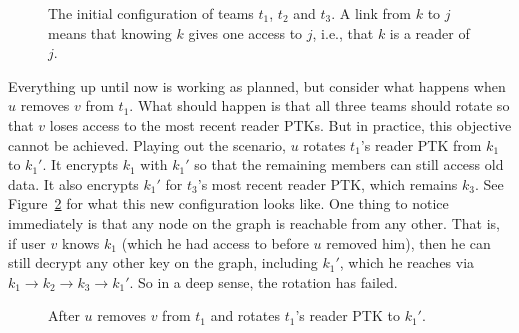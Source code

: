 \begin{figure}[ht]
    \centering
    \caption{The initial configuration of teams $t_1$, $t_2$ and $t_3$.
A link from $k$ to $j$ means that knowing $k$ gives one access to $j$, i.e., that $k$ is a reader of $j$.}
    \label{fig:cycle1}
\end{figure}


Everything up until now is working as planned, but consider what happens when
$u$ removes $v$ from $t_1$. What should happen is that all three teams should 
rotate so that $v$ loses access to the most recent reader PTKs. But in practice, this
objective cannot be achieved. Playing out the scenario, $u$ rotates $t_1$'s reader PTK
from $k_1$ to $k_1'$. It encrypts $k_1$ with $k_1'$ so that the remaining 
members can still access old data. It also encrypts $k_1'$ for $t_3$'s most recent reader
PTK, which remains $k_3$. See Figure~\ref{fig:cycle2} for what this new configuration looks like.
One thing to notice immediately is that any node on the graph is reachable from any other. That is,
if user $v$ knows $k_1$ (which he had access to before $u$ removed him), then he can still
decrypt any other key on the graph, including $k_1'$, which he reaches via
$k_1 \rightarrow k_2 \rightarrow k_3 \rightarrow k_1'$. So in a deep sense, the 
rotation has failed. 

\begin{figure}[ht]
    \centering
    \caption{After $u$ removes $v$ from $t_1$ and rotates $t_1$'s reader PTK to $k_1'$.}
    \label{fig:cycle2}
\end{figure}

